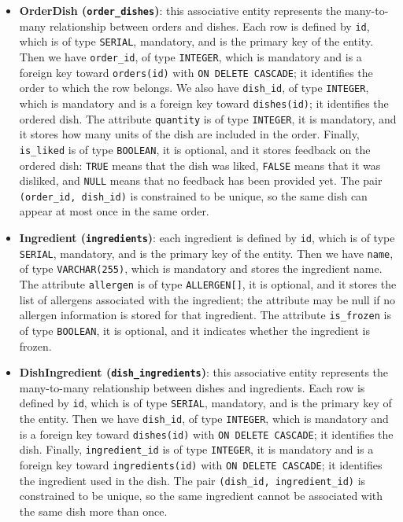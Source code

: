\begin{itemize}
    \item \textbf{OrderDish (\texttt{order\_dishes})}: this associative entity represents the many-to-many relationship between orders and dishes. Each row is defined by \texttt{id}, which is of type \texttt{SERIAL}, mandatory, and is the primary key of the entity. Then we have \texttt{order\_id}, of type \texttt{INTEGER}, which is mandatory and is a foreign key toward \texttt{orders(id)} with \texttt{ON DELETE CASCADE}; it identifies the order to which the row belongs. We also have \texttt{dish\_id}, of type \texttt{INTEGER}, which is mandatory and is a foreign key toward \texttt{dishes(id)}; it identifies the ordered dish. The attribute \texttt{quantity} is of type \texttt{INTEGER}, it is mandatory, and it stores how many units of the dish are included in the order. Finally, \texttt{is\_liked} is of type \texttt{BOOLEAN}, it is optional, and it stores feedback on the ordered dish: \texttt{TRUE} means that the dish was liked, \texttt{FALSE} means that it was disliked, and \texttt{NULL} means that no feedback has been provided yet. The pair \texttt{(order\_id, dish\_id)} is constrained to be unique, so the same dish can appear at most once in the same order.

    \item \textbf{Ingredient (\texttt{ingredients})}: each ingredient is defined by \texttt{id}, which is of type \texttt{SERIAL}, mandatory, and is the primary key of the entity. Then we have \texttt{name}, of type \texttt{VARCHAR(255)}, which is mandatory and stores the ingredient name. The attribute \texttt{allergen} is of type \texttt{ALLERGEN[]}, it is optional, and it stores the list of allergens associated with the ingredient; the attribute may be null if no allergen information is stored for that ingredient. The attribute \texttt{is\_frozen} is of type \texttt{BOOLEAN}, it is optional, and it indicates whether the ingredient is frozen.

    \item \textbf{DishIngredient (\texttt{dish\_ingredients})}: this associative entity represents the many-to-many relationship between dishes and ingredients. Each row is defined by \texttt{id}, which is of type \texttt{SERIAL}, mandatory, and is the primary key of the entity. Then we have \texttt{dish\_id}, of type \texttt{INTEGER}, which is mandatory and is a foreign key toward \texttt{dishes(id)} with \texttt{ON DELETE CASCADE}; it identifies the dish. Finally, \texttt{ingredient\_id} is of type \texttt{INTEGER}, it is mandatory and is a foreign key toward \texttt{ingredients(id)} with \texttt{ON DELETE CASCADE}; it identifies the ingredient used in the dish. The pair \texttt{(dish\_id, ingredient\_id)} is constrained to be unique, so the same ingredient cannot be associated with the same dish more than once.
\end{itemize}

